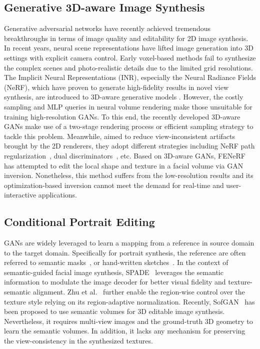 \documentclass[acmtog]{acmart}
\begin{document}
\subsection{Generative 3D-aware Image Synthesis} Generative adversarial networks have recently achieved tremendous breakthroughs in terms of image quality and editability for 2D image synthesis. In recent years, neural scene representations have lifted image generation into 3D settings with explicit camera control. Early voxel-based methods \cite{gadelha20173d, henzler2019escaping, nguyen2019hologan, nguyen2020blockgan, zhu2018visual} fail to synthesize the complex scenes and photo-realistic details due to the limited grid resolutions. The Implicit Neural Representations (INR), especially the Neural Radiance Fields (NeRF), which have proven to generate high-fidelity results in novel view synthesis, are introduced to 3D-aware generative models \cite{chan2021pi, schwarz2020graf}. However, the costly sampling and MLP queries in neural volume rendering make those unsuitable for training high-resolution GANs. To this end, the recently developed 3D-aware GANs make use of a two-stage rendering process \cite{xue2022giraffe, niemeyer2021giraffe, gu2021stylenerf, orel2021stylesdf, eg3d, xu2021volumegan} or efficient sampling strategy \cite{zhou2021cips3d, deng2021gram} to tackle this problem. Meanwhile, aimed to reduce view-inconsistent artifacts brought by the 2D renderers, they adopt different strategies including NeRF path regularization~\cite{gu2021stylenerf}, dual discriminators~\cite{eg3d}, etc. Based on 3D-aware GANs, FENeRF~\cite{sun2021fenerf} has attempted to edit the local shape and texture in a facial volume via GAN inversion. Nonetheless, this method suffers from the low-resolution results and its optimization-based inversion cannot meet the demand for real-time and user-interactive applications.



\subsection{Conditional Portrait Editing} GANs are widely leveraged to learn a mapping from a reference in source domain to the target domain. Specifically for portrait synthesis, the reference are often referred to semantic masks~\cite{park2019semantic,zhu2020sean}, or hand-written sketches~\cite{chen2021deepfaceediting,chen2020deepfacedrawing}. In the context of semantic-guided facial image synthesis, SPADE~\cite{park2019semantic} leverages the semantic information to modulate the image decoder for better visual fidelity and texture-semantic alignment. Zhu et al.~\cite{zhu2020sean} further enable the region-wise control over the texture style relying on its region-adaptive normalization. Recently, SofGAN~\cite{chen2020sofgan} has been proposed to use semantic volumes for 3D editable image synthesis. Nevertheless, it requires multi-view images and the ground-truth 3D geometry to learn the semantic volumes. In addition, it lacks any mechanism for preserving the view-consistency in the synthesized textures.
\end{document}
